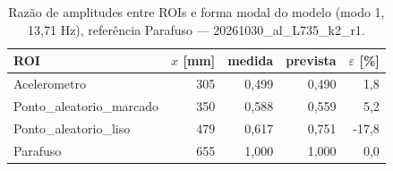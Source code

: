 \begin{table}[htbp]
  \centering
  \caption{Razão de amplitudes entre ROIs e forma modal do modelo (modo 1, 13{,}71 Hz), referência Parafuso — 20261030\_al\_L735\_k2\_r1.}
  \label{tab:forma_modal_20261030_al_L735_k2_r1}
  \begin{tabular}{lrrrr}
    \toprule
    ROI & $x$ [mm] & medida & prevista & $\varepsilon$ [\%] \\
    \midrule
    Acelerometro & 305 & 0{,}499 & 0{,}490 & 1{,}8 \\
    Ponto\_aleatorio\_marcado & 350 & 0{,}588 & 0{,}559 & 5{,}2 \\
    Ponto\_aleatorio\_liso & 479 & 0{,}617 & 0{,}751 & -17{,}8 \\
    Parafuso & 655 & 1{,}000 & 1{,}000 & 0{,}0 \\
    \bottomrule
  \end{tabular}
\end{table}
